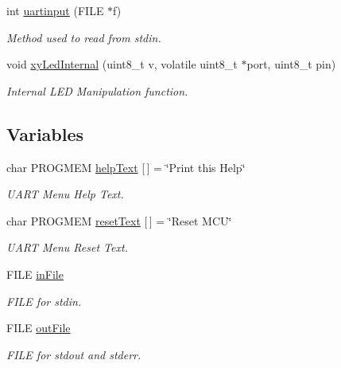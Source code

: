 \begin{DoxyCompactItemize}
int \hyperlink{group__xycontrol_ga3f158de66529c4606b8d8a380e5a5b07}{uartinput} (F\-I\-L\-E $\ast$f)
\begin{DoxyCompactList}\small\item\em Method used to read from stdin. \end{DoxyCompactList}\item 
void \hyperlink{group__xycontrol_ga8b94cac17e75735eec6f6fa42d21ab72}{xy\-Led\-Internal} (uint8\-\_\-t v, volatile uint8\-\_\-t $\ast$port, uint8\-\_\-t pin)
\begin{DoxyCompactList}\small\item\em Internal L\-E\-D Manipulation function. \end{DoxyCompactList}\end{DoxyCompactItemize}
\subsection*{Variables}
\begin{DoxyCompactItemize}
\item 
char P\-R\-O\-G\-M\-E\-M \hyperlink{group__xycontrol_gab29cf1c6b0f1a36311899902ec9364ea}{help\-Text} \mbox{[}$\,$\mbox{]} = \char`\"{}Print this Help\char`\"{}
\begin{DoxyCompactList}\small\item\em U\-A\-R\-T Menu Help Text. \end{DoxyCompactList}\item 
char P\-R\-O\-G\-M\-E\-M \hyperlink{group__xycontrol_ga27915b4caf41f74542980a4ea0f1726a}{reset\-Text} \mbox{[}$\,$\mbox{]} = \char`\"{}Reset M\-C\-U\char`\"{}
\begin{DoxyCompactList}\small\item\em U\-A\-R\-T Menu Reset Text. \end{DoxyCompactList}\item 
F\-I\-L\-E \hyperlink{group__xycontrol_gaad0ab56da43b41bbfeeaa3d1eca70e9c}{in\-File}
\begin{DoxyCompactList}\small\item\em F\-I\-L\-E for stdin. \end{DoxyCompactList}\item 
F\-I\-L\-E \hyperlink{group__xycontrol_gaa9e0cac6f45e381f488c1dd9a8418ca2}{out\-File}
\begin{DoxyCompactList}\small\item\em F\-I\-L\-E for stdout and stderr. \end{DoxyCompactList}\end{DoxyCompactItemize}


